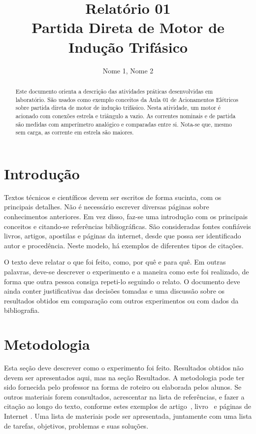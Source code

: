 \documentclass[twocolumn]{article}
\title{Relatório 01\\Partida Direta de Motor de Indução Trifásico}
\author{Nome 1, Nome 2}
\affil{Instituto Federal do Paraná -- Campus Campo Largo\\
	Curso Técnico em Automação Integrado ao Ensino Médio\\
	Acionamentos Elétricos\\
	Prof. Diego Tefili}
\begin{document}
\maketitle        

\begin{abstract}
Este documento orienta a descrição das atividades práticas desenvolvidas em laboratório. São usados como exemplo conceitos da Aula 01 de Acionamentos Elétricos sobre partida direta de motor de indução trifásico. Nesta atividade, um motor é acionado com conexões estrela e triângulo a vazio. As correntes nominais e de partida são medidas com amperímetro analógico e comparadas entre si. Nota-se que, mesmo sem carga, as corrente em estrela são maiores. 
\end{abstract}

\section{Introdução}

Textos técnicos e científicos devem ser escritos de forma sucinta, com os principais detalhes. Não é necessário escrever diversas páginas sobre conhecimentos anteriores. Em vez disso, faz-se uma introdução com os principais conceitos e citando-se referências bibliográficas. São consideradas fontes confiáveis livros, artigos, apostilas e páginas da internet, desde que possa ser identificado autor e procedência. Neste modelo, há exemplos de diferentes tipos de citações. 

O texto deve relatar o que foi feito, como, por quê e para quê. Em outras palavras, deve-se descrever o experimento e a maneira como este foi realizado, de forma que outra pessoa consiga repeti-lo seguindo o relato. O documento deve ainda conter justificativas das decisões tomadas e uma discussão sobre os resultados obtidos em comparação com outros experimentos ou com dados da bibliografia.

\section{Metodologia}

Esta seção deve descrever como o experimento foi feito. Resultados obtidos não devem ser apresentados aqui, mas na seção Resultados. A metodologia pode ter sido fornecida pelo professor na forma de roteiro ou elaborada pelos alunos. Se outros materiais forem consultados, acrescentar na lista de referências, e fazer a citação ao longo do texto, conforme estes exemplos de artigo~\cite{tefili2013implantes}, livro~\cite{fitzgerald1975maquinas} e páginas de Internet \cite{Messner2011,Tefili2017}. Uma lista de materiais pode ser apresentada, juntamente com uma lista de tarefas, objetivos, problemas e suas soluções.
\end{document}
